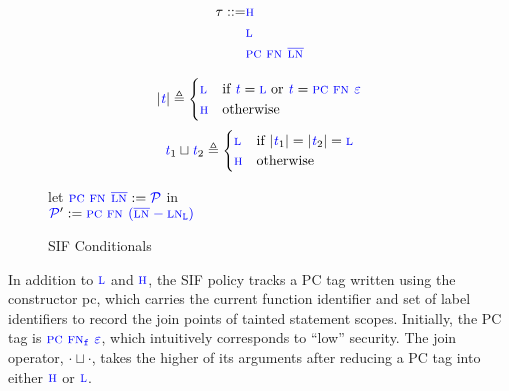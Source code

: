 \documentclass{llncs}
\begin{document}
\begin{figure}
  \scriptsize
  \begin{minipage}{0.3\textwidth}
    \color{blue}
    \begin{align*}
      \tau ::= & \high \\
      & \low \\
      & \pctaint{\FN[]}{\overline{\LN[]}} \\
    \end{align*}
  \end{minipage}
  \begin{minipage}{0.69\textwidth}
    \[|\gentag| \triangleq
    \begin{cases}
      \low & \textnormal{if } \gentag = \low \textnormal{ or } \gentag = \pctaint{\FN[]}{\varepsilon} \\
      \high & \textnormal{otherwise} \\
    \end{cases}\]
    \[\gentag_1 \sqcup \gentag_2 \triangleq
    \begin{cases}
      \low & \textnormal{if } |\gentag_1| = |\gentag_2| = \low \\
      \high & \textnormal{otherwise} \\
    \end{cases}\]
  \end{minipage}
  \begin{minipage}{0.45\textwidth}
  \end{minipage}
  \begin{minipage}{0.5\textwidth}
        {let \(\pctaint{\FN[]}{\overline{\LN[]}} := \PCT\) in \\
          \(\PCT' := \pctaint{\FN[]}{(\overline{\LN[]}-\LN)}\)
        }
  \end{minipage}
  
  \caption{SIF Conditionals}
  \label{fig:SIFconditionals}
\end{figure}

In addition to \(\low\) and \(\high\), the SIF policy tracks a PC tag written using the
constructor {\sc \color{blue} pc}, which carries the current function identifier and
set of label identifiers to record the join points of tainted statement scopes.
Initially, the PC tag is \(\pctaint{\FN[f]}{\varepsilon}\), which intuitively corresponds
to ``low'' security. The join operator, \(\cdot \sqcup \cdot\), takes the higher of its
arguments after reducing a PC tag into either \(\high\) or \(\low\).
\end{document}
